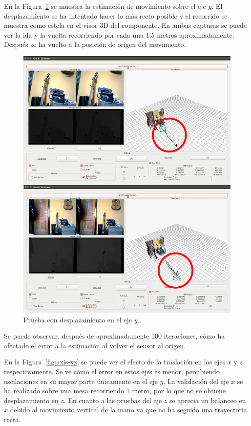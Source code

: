 En la Figura~\ref{fig:axis-y} se muestra la estimación de movimiento sobre el eje $y$. El desplazamiento se ha intentado hacer lo más recto posible y el recorrido se muestra como estela en el visor 3D del componente. En ambas capturas se puede ver la ida y la vuelta recorriendo por cada una 1.5 metros aproximadamente. Después se ha vuelto a la posición de origen del movimiento.

\begin{figure}[th]
\centering
\includegraphics[scale=0.35]{Figures/tests/axis-y.png}
\decoRule
\caption[Prueba con desplazamiento en el eje $y$]{Prueba con desplazamiento en el eje $y$.}
\label{fig:axis-y}
\end{figure}

Se puede observar, después de aproximadamente 100 iteraciones, cómo ha afectado el error a la estimación al volver el sensor al origen.

En la Figura~\ref{fig:axis-xz} se puede ver el efecto de la traslación en los ejes $x$ y $z$ respectivamente. Se ve cómo el error en estos ejes es menor, percibiendo oscilaciones en su mayor parte únicamente en el eje $y$. La validación del eje $x$ se ha realizado sobre una mesa recorriendo 1 metro, por lo que no se obtiene desplazamiento en $z$. En cuanto a las pruebas del eje $z$ se aprecia un balanceo en $x$ debido al movimiento vertical de la mano ya que no ha seguido una trayectoria recta.

